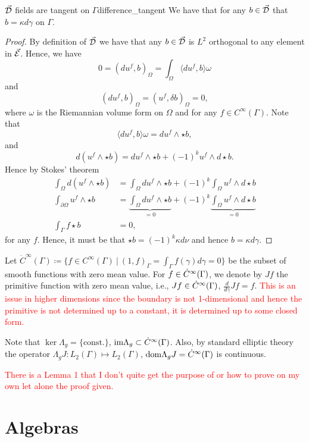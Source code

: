   \begin{prop}{$\vec{\mathcal{D}}$ fields are tangent on $\Gamma$}{difference_tangent}  
  We have that for any $b\in \vec{\mathcal{D}}$ that $b=\kappa d \gamma$ on $\Gamma$.
  \tcblower
  \begin{proof}	
  By definition of $\vec{\mathcal{D}}$ we have that any $b\in \vec{\mathcal{D}}$ is $L^2$ orthogonal to any element in $\vec{\mathcal{E}}$. Hence, we have
   \[
  0=(du^f,b)_\Omega=\int_\Omega \langle du^f,b\rangle \omega
   \]
   and
   \[
   (du^f,b)_\Omega = (u^f,\delta b)_\Omega =0,
   \]
  where $\omega$ is the Riemannian volume form on $\Omega$ and for any $f\in C^\infty (\Gamma)$.   Note that
  \[
  \langle du^f,b\rangle \omega = du^f \wedge \star b,
  \]
  and
  \[
  d(u^f \wedge \star b) = du^f \wedge \star b + (-1)^k u^f \wedge d\star b.
  \]
  Hence by Stokes' theorem
  \begin{align*}
  	\int_\Omega d(u^f \wedge \star b) &= \int_\Omega du^f \wedge \star b + (-1)^k \int_\Omega u^f \wedge d \star b\\
  	\int_{\partial \Omega} u^f \wedge \star b &=\underbrace{\int_\Omega du^f \wedge \star b}_{=0} + (-1)^k \underbrace{\int_\Omega u^f \wedge d \star b}_{=0}\\
  	\int_\Gamma f \star b &= 0,
  \end{align*}
  for any $f$. Hence, it must be that $\star b = (-1)^k\kappa d\nu$ and hence $b=\kappa d\gamma$.
  \end{proof}
  \end{prop}

Let $\dot{C}^\infty(\Gamma)\coloneqq \{f\in C^\infty (\Gamma) ~\vert~ (1,f)_\Gamma=\int_\Gamma f(\gamma)d\gamma=0\}$ be the subset of smooth functions with zero mean value. For $f\in\dot{C}^\infty(\Gamma)$, we denote by $Jf$ the primitive function with zero mean value, i.e., $Jf\in \dot{C}^\infty(\Gamma)$, $\frac{d}{d\gamma}Jf=f$. \textcolor{red}{This is an issue in higher dimensions since the boundary is not 1-dimensional and hence the primitive is not determined up to a constant, it is determined up to some closed form.}

Note that $\ker \Lambda_g = \{\textrm{const.}\}$, $\mathrm{im} \Lambda_g \subset \dot{C}^\infty(\Gamma)$. Also, by standard elliptic theory the operator $\Lambda_g J \colon L_2(\Gamma) \mapsto L_2(\Gamma)$, $\mathrm{dom} \Lambda_g J = \dot{C}^\infty(\Gamma)$ is continuous.

\textcolor{red}{There is a Lemma 1 that I don't quite get the purpose of or how to prove on my own let alone the proof given.}

\section{Algebras}

